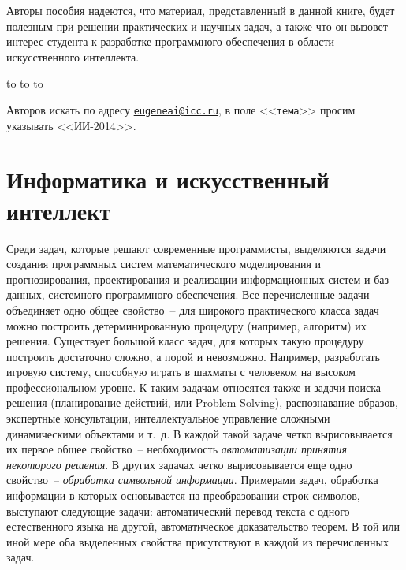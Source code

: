 \documentclass[a4paper,14pt, openany, twoside, draft]{extbook} %
\newcommand{\aaa}[2][acolor]{\noindent\textcolor{eclr}%
{+\ [}\textcolor{#1}{#2}\textcolor{eclr}{]}}
\begin{document}
Авторы пособия надеются, что материал, представленный в данной книге, будет полезным при решении практических и научных задач, а также что он вызовет интерес студента к разработке программного обеспечения в области искусственного интеллекта.


\medskip

\noindent\hbox to \linewidth{\hfill\sf От имени и по поручению коллектива авторов,}
\noindent\hbox to \linewidth{\hfill\sf доцент кафедры ИТ ИМЭИ ИГУ}
\noindent\hbox to \linewidth{\hfill\sf канд.~техн.~наук Е.~А.~Черкашин}

\vfill
\makeatletter
{} Авторов искать по адресу \href{mailto:eugeneai@icc.ru}{\tt{}eugeneai@icc.ru}, в поле <<{\tt тема}>> просим указывать <<ИИ-2014>>.
\makeatother

\chapter{Информатика и искусственный интеллект}

Среди задач, которые решают современные программисты, выделяются задачи создания программных систем математического моделирования и прогнозирования, проектирования и реализации информационных систем и баз данных, системного программного обеспечения. Все перечисленные задачи объединяет одно общее свойство~-- для широкого практического класса задач можно построить детерминированную процедуру (например, алгоритм) их решения. Существует большой класс задач, для которых такую процедуру построить достаточно сложно, а порой и невозможно. Например, разработать игровую систему, способную играть в шахматы с человеком на высоком профессиональном уровне. К таким задачам относятся также и задачи поиска решения (планирование действий, или Problem Solving), распознавание образов, экспертные консультации, интеллектуальное управление сложными динамическими объектами и т.~д. В каждой такой задаче четко вырисовывается их первое общее свойство~-- необходимость {\em автоматизации принятия некоторого решения}. В других задачах четко вырисовывается еще одно свойство~-- {\em обработка символьной информации}. Примерами задач, обработка информации в которых основывается на преобразовании строк символов, выступают следующие задачи: автоматический перевод текста с одного естественного языка на другой, автоматическое доказательство теорем. В той или иной мере оба выделенных свойства присутствуют в каждой из перечисленных задач.
\end{document}
